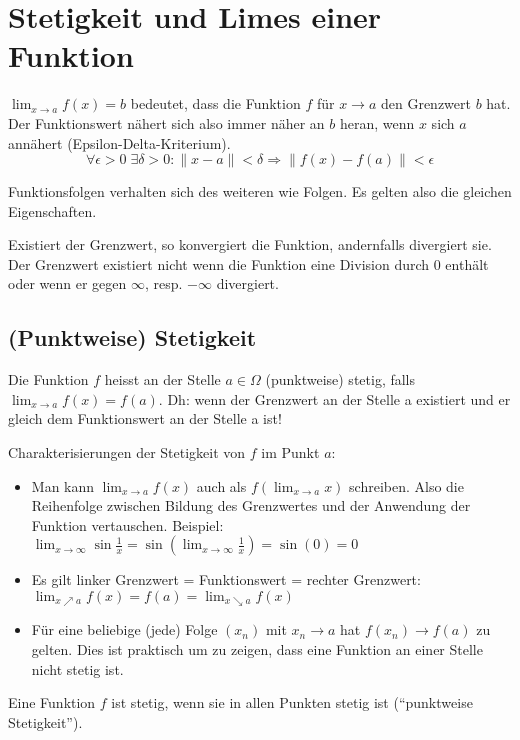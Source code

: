 \section{Stetigkeit und Limes einer Funktion}
$\lim_{x \to a} f(x) = b$ bedeutet, dass die Funktion $f$ für $x \to a$ den
Grenzwert $b$ hat. Der Funktionswert nähert sich also immer näher an $b$ heran,
wenn $x$ sich $a$ annähert (Epsilon-Delta-Kriterium).
\[
\forall \epsilon > 0 \; \exists \delta > 0: \|x -a\| < \delta \Rightarrow
\|f(x) - f(a)\| < \epsilon
\]

Funktionsfolgen verhalten sich des weiteren wie Folgen. Es gelten also die
gleichen Eigenschaften.

Existiert der Grenzwert, so konvergiert die Funktion, andernfalls divergiert sie. 
Der Grenzwert existiert nicht wenn die Funktion eine Division durch 0 enthält oder 
wenn er gegen $\infty$, resp. $-\infty$ divergiert.

\subsection{(Punktweise) Stetigkeit}
\begin{definition} 
Die Funktion $f$ heisst an der Stelle $a \in \Omega$ (punktweise) stetig, falls $\lim_{x \to a} f(x) = f(a)$. Dh: wenn der Grenzwert an der Stelle a existiert und er gleich dem Funktionswert an der Stelle a ist!
\end{definition}

Charakterisierungen der Stetigkeit von $f$ im Punkt $a$:
\begin{itemize}
	\item Man kann $\lim_{x \to a} f(x)$ auch als $f(\lim_{x \to a} x)$ schreiben.
	Also die Reihenfolge zwischen Bildung des Grenzwertes und der Anwendung der
	Funktion vertauschen. Beispiel: $\lim_{x \to \infty} \sin\frac{1}{x} =
	\sin(\lim_{x \to \infty} \frac{1}{x}) = \sin(0) = 0$
	\item Es gilt linker Grenzwert = Funktionswert = rechter Grenzwert: $\lim_{x
	\nearrow a} f(x) = f(a) = \lim_{x \searrow a} f(x)$
	\item Für eine beliebige (jede) Folge $(x_n)$ mit $x_n \to a$ hat $f(x_n) \to
	f(a)$ zu gelten. Dies ist praktisch um zu zeigen, dass eine Funktion an einer
	Stelle nicht stetig ist.
\end{itemize}

Eine Funktion $f$ ist stetig, wenn sie in allen Punkten stetig ist
(``punktweise Stetigkeit'').

